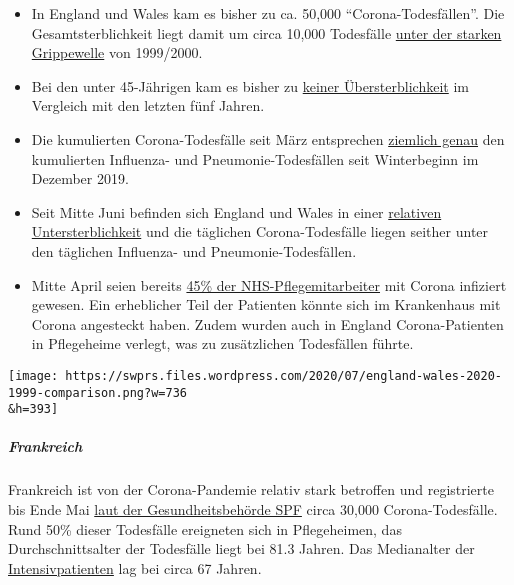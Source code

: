\begin{itemize}
\tightlist
\item
  In England und Wales kam es bisher zu ca. 50,000
  ``Corona-Todesfällen''. Die Gesamtsterblichkeit liegt damit um circa
  10,000 Todesfälle \href{http://inproportion2.talkigy.com/}{unter der
  starken Grippewelle} von 1999/2000.
\item
  Bei den unter 45-Jährigen kam es bisher zu
  \href{http://inproportion2.talkigy.com/}{keiner Übersterblichkeit} im
  Vergleich mit den letzten fünf Jahren.
\item
  Die kumulierten Corona-Todesfälle seit März entsprechen
  \href{http://inproportion2.talkigy.com/}{ziemlich genau} den
  kumulierten Influenza- und Pneumonie-Todesfällen seit Winterbeginn im
  Dezember 2019.
\item
  Seit Mitte Juni befinden sich England und Wales in einer
  \href{https://www.ons.gov.uk/peoplepopulationandcommunity/birthsdeathsandmarriages/deaths/bulletins/deathsregisteredweeklyinenglandandwalesprovisional/weekending17july2020}{relativen
  Untersterblichkeit} und die täglichen Corona-Todesfälle liegen seither
  unter den täglichen Influenza- und Pneumonie-Todesfällen.
\item
  Mitte April seien bereits
  \href{https://www.thesun.co.uk/news/12182503/nearly-half-nhs-workers-infected-coronavirus-peak-epidemic/}{45\%
  der NHS-Pflegemitarbeiter} mit Corona infiziert gewesen. Ein
  erheblicher Teil der Patienten könnte sich im Krankenhaus mit Corona
  angesteckt haben. Zudem wurden auch in England Corona-Patienten in
  Pflegeheime verlegt, was zu zusätzlichen Todesfällen führte.
\end{itemize}

\texttt{[image: https://swprs.files.wordpress.com/2020/07/england-wales-2020-1999-comparison.png?w=736\\\&h=393]}

\hypertarget{frankreich}{%
\subparagraph{\texorpdfstring{\textbf{Frankreich}}{Frankreich}}\label{frankreich}}

Frankreich ist von der Corona-Pandemie relativ stark betroffen und
registrierte bis Ende Mai
\href{https://www.santepubliquefrance.fr/maladies-et-traumatismes/maladies-et-infections-respiratoires/infection-a-coronavirus/documents/rapport-synthese/surveillance-de-la-mortalite-au-cours-de-l-epidemie-de-covid-19-du-2-mars-au-31-mai-2020-en-france}{laut
der Gesundheitsbehörde SPF} circa 30,000 Corona-Todesfälle. Rund 50\%
dieser Todesfälle ereigneten sich in Pflegeheimen, das
Durchschnittsalter der Todesfälle liegt bei 81.3 Jahren. Das Medianalter
der
\href{https://www.santepubliquefrance.fr/content/download/260891/2645733}{Intensivpatienten}
lag bei circa 67 Jahren.


